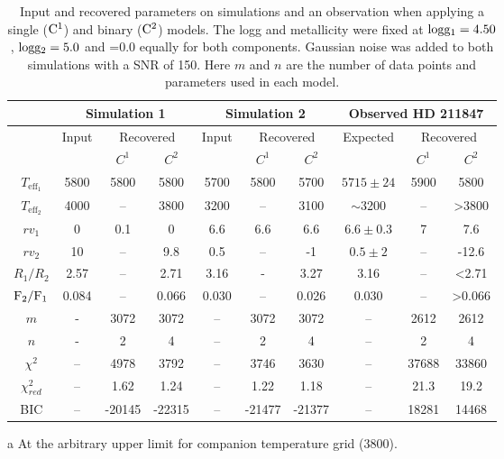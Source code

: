 
\begin{table*}
      \centering
 \begin{threeparttable}
    \caption{Input and recovered parameters on simulations and an observation when applying a single (\(\rm C^1\)) and binary (\(\rm C^2\)) models. The logg and metallicity were fixed at \(\rm logg_1 = 4.50\), \(\rm logg_2=5.0\) and \feh{}=0.0 equally for both components. Gaussian noise was added to both simulations with a {SNR} of 150. Here \(m\) and \(n\) are the number of data points and parameters used in each model.}
  
    \begin{tabular}{c | *3c | *3c | *3c}
        \toprule
        & \multicolumn{3}{c|}{Simulation 1} & \multicolumn{3}{c|}{Simulation 2} & \multicolumn{3}{c}{Observed {HD 211847}} \\
        \midrule
        & Input & \multicolumn{2}{c|}{Recovered} & Input & \multicolumn{2}{c|}{Recovered} & Expected & \multicolumn{2}{c}{Recovered} \\
        & & \(C^1\) & \(C^2\) & & \(C^1\) & \(C^2\) & & \(C^1\)  & \(C^2\) \\
        \midrule
        \(T_{\textrm{eff}_1}\) & 5800 & 5800 & 5800 & 5700 & 5800 & 5700 & \(5715 \pm 24\) & 5900 & 5800\\
        \(T_{\textrm{eff}_2}\) & 4000 & -- & 3800 & 3200 & -- & 3100 & \(\sim\)3200 & -- & >3800\tnote{a}\\
        \({rv}_1\) & 0 & 0.1 & 0 & 6.6 & 6.6 & 6.6 & \(6.6 \pm 0.3\) & 7& 7.6 \\
        \({rv}_2\) &  10 & -- & 9.8 & 0.5 & -- &  -1& \(0.5 \pm 2\) & -- &-12.6\\
        \midrule
        \(R_1/R_2\)& 2.57 & -- & 2.71& 3.16 & - & 3.27 & 3.16 & -- & <2.71\tnote{a}\\
        \(\rm F_2/F_1\)& 0.084 & -- & 0.066 & 0.030 & -- & 0.026 & 0.030 & -- & >0.066\tnote{a}\\
       \(m\) & - & 3072 & 3072 & -- & 3072 & 3072 & -- & 2612 & 2612\\
         \(n\) & - & 2 & 4 & -- & 2 & 4 & -- & 2 & 4\\
        \(\chi^2\)& -- & 4978 & 3792 & -- & 3746 & 3630  & -- & 37688 & 33860\\
        \(\chi^2_{red}\) & -- & 1.62 & 1.24 & -- & 1.22 & 1.18 & -- & 21.3 & 19.2\\
        {BIC} & -- & -20145 & -22315 & -- & -21477& -21377& -- & 18281 & 14468\\
        \bottomrule
    \end{tabular}

\label{tab:example_params}
    \begin{tablenotes}
       \item [a] {At the arbitrary upper limit for companion temperature grid (3800\K{}).}
    \end{tablenotes}
\end{threeparttable}
\end{table*}